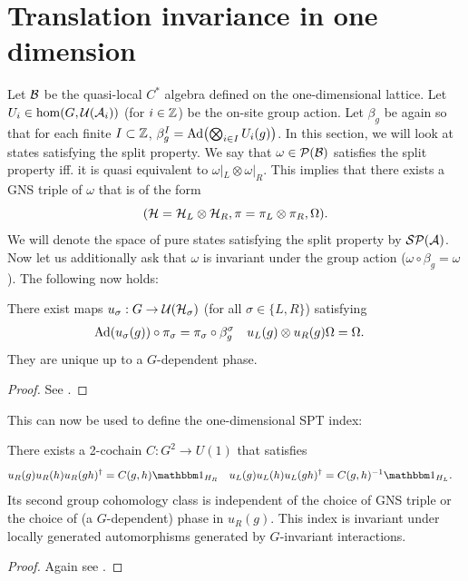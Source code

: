 \documentclass[11pt,a4paper,twoside]{article}
\numberwithin{equation}{section}
\begin{document}
	\section{Translation invariance in one dimension}\label{sec:OneDimensionalIndices}
	Let $\mathcal B$ be the quasi-local $C^*$ algebra defined on the one-dimensional lattice. Let $U_i\in\hom(G,\mathcal U(\mathcal A_i))$ (for $i\in\mathbb Z$) be the on-site group action. Let $\beta_g$ be again so that for each finite $I\subset \mathbb Z$, $\beta_g^I=\Ad{\bigotimes_{i\in I}U_i(g)}$. In this section, we will look at states satisfying the split property. We say that $\omega\in\mathcal P(\mathcal B)$ satisfies the split property iff. it is quasi equivalent to $\omega|_{L}\otimes\omega|_{R}$. This implies that there exists a GNS triple of $\omega$ that is of the form
	\begin{equation}
		(\mathcal H=\mathcal H_L\otimes\mathcal H_R,\pi=\pi_L\otimes\pi_R,\Omega).
	\end{equation}
	We will denote the space of pure states satisfying the split property by $\mathcal{S}\mathcal P(\mathcal A)$. Now let us additionally ask that $\omega$ is invariant under the group action ($\omega\circ\beta_g=\omega$). The following now holds:
	\begin{lemma}
		There exist maps $u_\sigma:G\rightarrow \mathcal U(\mathcal H_\sigma)$ (for all $\sigma\in\{L,R\}$) satisfying
		\begin{align}
			\Ad{u_\sigma(g)}\circ\pi_\sigma&=\pi_\sigma\circ\beta_g^\sigma&u_L(g)\otimes u_R(g)\Omega&=\Omega.
		\end{align}
		They are unique up to a $G$-dependent phase.
	\end{lemma}
	\begin{proof}
		See \cite{ogata2019classification}.
	\end{proof}
	This can now be used to define the one-dimensional SPT index:
	\begin{lemma}
		There exists a 2-cochain $C:G^2\rightarrow U(1)$ that satisfies
		\begin{align}
			u_R(g)u_R(h)u_R(gh)^{\dagger}&=C(g,h)\id_{H_R}&u_L(g)u_L(h)u_L(gh)^{\dagger}&=C(g,h)^{-1}\id_{H_L}.
		\end{align}
		Its second group cohomology class is independent of the choice of GNS triple or the choice of (a $G$-dependent) phase in $u_R(g)$. This index is invariant under locally generated automorphisms generated by $G$-invariant interactions.
	\end{lemma}
	\begin{proof}
		Again see \cite{ogata2019classification}.
	\end{proof}
\end{document}
